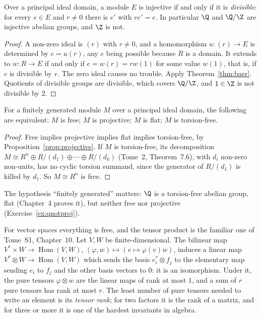 \begin{corollary}\label{cor:divisible}
Over a principal ideal domain, a module $E$ is injective if and only if it is \emph{divisible}: for every $e\in E$ and $r\ne0$ there is $e'$ with $re'=e$. In particular $\Q$ and $\Q/\Z$ are injective abelian groups, and $\Z$ is not.
\end{corollary}

\begin{proof}
A non-zero ideal is $(r)$ with $r\ne0$, and a homomorphism $u\colon(r)\to E$ is determined by $e=u(r)$, any $e$ being possible because $R$ is a domain. It extends to $w\colon R\to E$ if and only if $e=w(r)=rw(1)$ for some value $w(1)$, that is, if
$e$ is divisible by $r$. The zero ideal causes no trouble. Apply Theorem~\ref{thm:baer}. Quotients of divisible groups are divisible, which covers $\Q/\Z$, and $1\in\Z$ is not divisible by $2$.
\end{proof}

\begin{theorem}\label{thm:pidflat}
For a finitely generated module $M$ over a principal ideal domain, the following are equivalent: $M$ is free; $M$ is projective; $M$ is flat; $M$ is torsion-free.
\end{theorem}

\begin{proof}
Free implies projective implies flat implies torsion-free, by Proposition~\ref{prop:projective}. If $M$ is torsion-free, its decomposition $M\cong R^n\oplus R/(d_1)\oplus\cdots\oplus R/(d_k)$ (Tome~2, Theorem~7.6), with $d_i$ non-zero non-units,
has no cyclic torsion summand, since the generator of $R/(d_1)$ is killed by $d_1$. So $M\cong R^n$ is free.
\end{proof}

The hypothesis ``finitely generated'' matters: $\Q$ is a torsion-free abelian group, flat (Chapter~4 proves it), but neither free nor projective (Exercise~\ref{ex:qnotproj}).

For vector spaces everything is free, and the tensor product is the familiar one of Tome~S1, Chapter~10. Let $V,W$ be finite-dimensional. The bilinear map $V^*\times W\to\operatorname{Hom}(V,W)$, $(\varphi,w)\mapsto(v\mapsto\varphi(v)w)$, induces a
linear map $V^*\otimes W\to\operatorname{Hom}(V,W)$ which sends the basis $e_i^*\otimes f_j$ to the elementary map sending $e_i$ to $f_j$ and the other basis vectors to $0$: it is an isomorphism. Under it, the pure tensors
$\varphi\otimes w$ are the linear maps of rank at most $1$, and a sum of $r$ pure tensors has rank at most $r$. The least number of pure tensors needed to write an element is its \emph{tensor rank}; for two factors it is the
rank of a matrix, and for three or more it is one of the hardest invariants in algebra.

